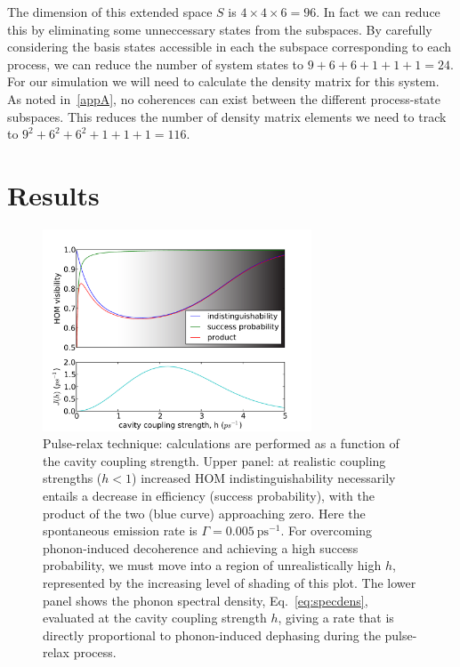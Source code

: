 The dimension of this extended space $S$ is $4 \times 4 \times 6 = 96$. In fact we can reduce this by eliminating some unneccessary states from the subspaces. By carefully considering the basis states accessible in each the subspace corresponding to each process, we can reduce the number of system states to $9 + 6 + 6 + 1 + 1 + 1 = 24$. For our simulation we will need to calculate the density matrix for this system. As noted in~\ref{appA}, no coherences can exist between the different process-state subspaces. This reduces the number of density matrix elements we need to track to $9^2 + 6^2 + 6^2 + 1 + 1 + 1 = 116$.

\section{Results}

\begin{figure}[htb]
  \begin{center}
  \includegraphics[width=8cm]{assets/2LS_plot.pdf}
  \end{center}
  \caption{Pulse-relax technique: calculations are performed as a function of the cavity coupling strength. Upper panel: at realistic coupling strengths ($h<1$) increased HOM indistinguishability necessarily entails a decrease in efficiency (success probability), with the product of the two (blue curve) approaching zero. Here the spontaneous emission rate is $\Gamma = 0.005~\mathrm{ps}^{-1}$. For overcoming phonon-induced decoherence and achieving a  high success probability, we must move into a region of unrealistically high $h$, represented by the increasing level of shading of this plot.
 The lower panel shows the phonon spectral density, Eq.~\ref{eq:specdens}, evaluated at the cavity coupling strength $h$, giving a rate that is directly proportional to phonon-induced dephasing during the pulse-relax process.
 }
  \label{2LS_plot}
\end{figure}

